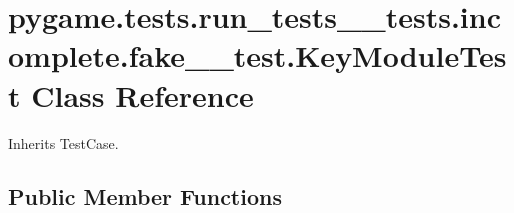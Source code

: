 \hypertarget{classpygame_1_1tests_1_1run__tests____tests_1_1incomplete_1_1fake__2__test_1_1_key_module_test}{}\section{pygame.\+tests.\+run\+\_\+tests\+\_\+\+\_\+tests.\+incomplete.\+fake\+\_\+\_\+test.\+Key\+Module\+Test Class Reference}
\label{classpygame_1_1tests_1_1run__tests____tests_1_1incomplete_1_1fake__2__test_1_1_key_module_test}


Inherits Test\+Case.

\subsection*{Public Member Functions}
